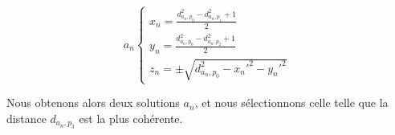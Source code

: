 \vspace{0.4cm}

\[
a_{n}\left \{
   	\begin{array}{l}
      x_{n}= \frac{d_{a_{n},p_{0}}^2 - d_{a_{n},p_{1}}^2 + 1}{2}\\
      y_{n}= \frac{d_{a_{n},p_{0}}^2 - d_{a_{n},p_{2}}^2 + 1}{2}\\
	  z_{n}= \pm\sqrt{d_{a_{n},p_{0}}^2 - x_{n}'^2 - y_{n}'^2}
   	\end{array}
   	\right .
   	\:
\]

\vspace{0.4cm}

Nous obtenons alors deux solutions $a_n$, et nous sélectionnons celle telle que la distance $d_{a_{n},p_{3}}$ est la plus cohérente.